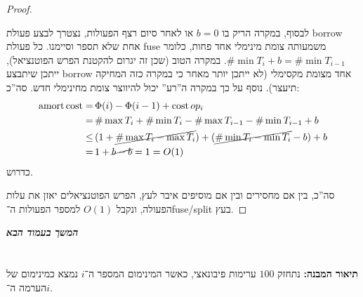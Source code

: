 \documentclass[]{article}
\newcommand\npage {\vfil {\hfil \textbf{\textit{המשך בעמוד הבא}}} \hfil \vfil \pagebreak}
\theoremstyle{definition}
\DeclareMathOperator\amort   {amort}
\DeclareMathOperator\cost    {cost}
\begin{document}
\begin{proof}
\begin{itemize}
            לבסוף, במקרה הריק בו $b = 0$ או לאחר סיום רצף הפעולות, נצטרך לבצע פעולת borrow אחת שלא תספר וסיימנו. כל פעולת fuse משמעותה צומת מינימלי אחד פחות, כלומר $\#\min T_i + b = \#\min T_{i - 1}$. במקרה הטוב (שכן זה יגרום להקטנת הפרש הפוטנציאל), ייתכן שיתבצע borrow אחד מצומת מקסימלי (לא ייתכן יותר מאחר כי במקרה כזה המחיקה תיעצר). נוסף על כך במקרה ה''רע'' יכול להיווצר צומת מחינימלי חדש. 
            סה''כ: 
            \begin{align*}
                \amort \cost =\, & \Phi(i) - \Phi(i - 1) + \cost op_i \\
                =\, &\#\max T_i + \#\min T_i - \#\max T_{i - 1} - \#\min T_{i - 1} + b \\ 
                \le \, &(1 + \cancel{\#\max T_i - \max T_i}) + (\cancel{\# \min T_i - \min T_i} - b) + b \\
                = \, & 1 + \cancel{b - b} = 1 = O(1)
            \end{align*}
            כדרוש. 
        \end{itemize}
        סה''כ, בין אם מחסירים ובין אם מוסיפים איבר לעץ, הפרש הפוטנציאלים יאזן את עלות הפעולה, ונקבל $O(1)$ למספר הפעולות ה־fuse/split בעץ. 
        
    \end{proof}
    
    \npage
    \section{}
    \textbf{תיאור המבנה: }נתחזק $100$ ערימות פיבונאצי, כאשר המינימום המספר ה־$i$ נמצא כמינימום של הערמה ה־$i$. 
    
\end{document}
